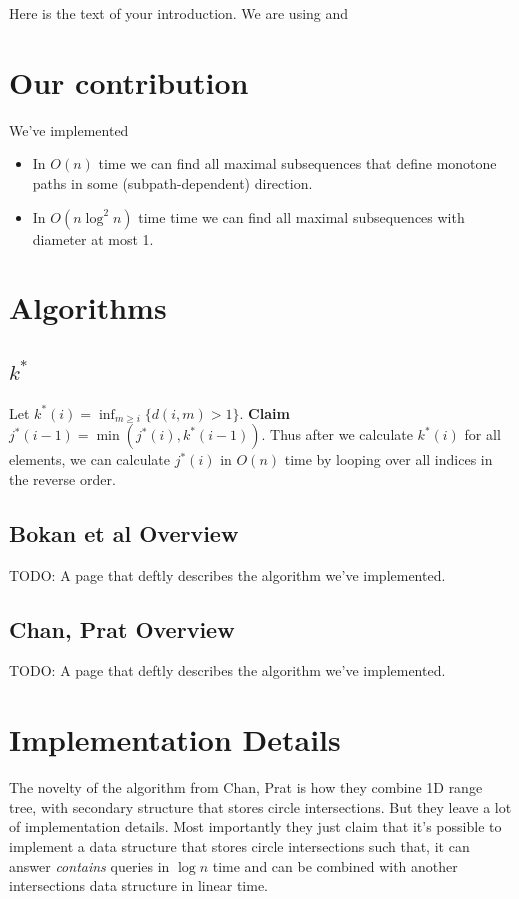 \documentclass{article}
\begin{document}
Here is the text of your introduction.
We are using \cite{bokal_et_al:LIPIcs:2015:5113} and \cite{chan_et_al:LIPIcs:2016:5920}

\section{Our contribution}
We've implemented
\begin{itemize}
\item In $O(n)$ time  we  can  find  all  maximal  subsequences  that  define  monotone  paths  in  some (subpath-dependent) direction. \cite{bokal_et_al:LIPIcs:2015:5113} 
\item In $O(n \log^2 n)$ time time we can find all maximal subsequences with diameter at most 1. \cite{chan_et_al:LIPIcs:2016:5920}
\end{itemize}

\section{Algorithms}
\subsection{$k^*$}

Let $k^*(i) = \inf_{m \geq i} \{d(i, m) > 1\}$. \textbf{Claim} $j^*(i-1) = \min(j^*(i), k^*(i-1))$. Thus after we calculate $k^*(i)$ for all elements, we can calculate $j^*(i)$ in $O(n)$ time by looping over all indices in the reverse order.

\subsection{Bokan et al Overview}
TODO: A page that deftly describes the algorithm we've implemented.

\subsection{Chan, Prat Overview}
TODO: A page that deftly describes the algorithm we've implemented.

\section{Implementation Details}
The novelty of the algorithm from Chan, Prat is how they combine 1D range tree, with secondary structure that stores circle intersections. But they leave a lot of implementation details. Most importantly they just claim that it's possible to implement a data structure that stores circle intersections such that, it can answer \textit{contains} queries in $\log n$ time and can be combined with another intersections data structure in linear time.
\end{document}
